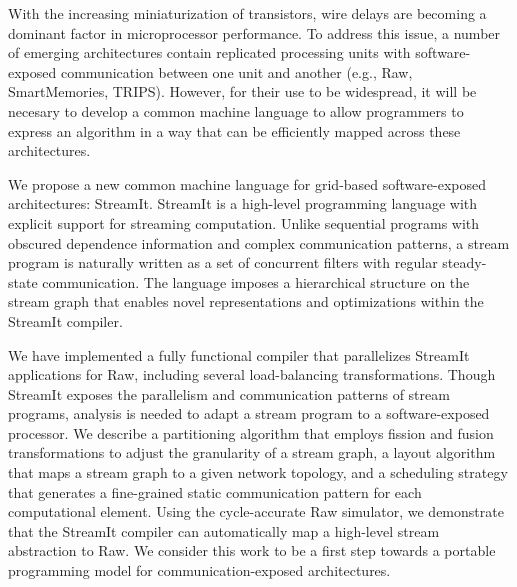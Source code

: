 With the increasing miniaturization of transistors, wire delays are
becoming a dominant factor in microprocessor performance.  To address
this issue, a number of emerging architectures contain replicated
processing units with software-exposed communication between one unit
and another (e.g., Raw, SmartMemories, TRIPS).  
However, for their use to be widespread, it will be necesary to
develop a common machine language to allow programmers to express an
algorithm in a way that can be efficiently mapped across 
these architectures. 
  
We propose a new common machine language for grid-based
software-exposed architectures: StreamIt. StreamIt is a
high-level programming language with explicit support for streaming
computation.  Unlike sequential programs with
obscured dependence information and complex communication patterns, a
stream program is naturally written as a set of concurrent filters
with regular steady-state communication.  The language
imposes a hierarchical structure on the stream graph that enables
novel representations and optimizations within the StreamIt compiler.

We have implemented a fully functional compiler that parallelizes
StreamIt applications for Raw, including several load-balancing
transformations. Though StreamIt exposes the parallelism and
communication patterns of stream programs, analysis is needed to
adapt a stream program to a software-exposed processor.  We describe a
partitioning algorithm that employs fission and fusion transformations
to adjust the granularity of a stream graph, a layout algorithm that
maps a stream graph to a given network topology, and a scheduling
strategy that generates a fine-grained static communication pattern
for each computational element.  Using the cycle-accurate Raw
simulator, we demonstrate that the StreamIt compiler can automatically
map a high-level stream abstraction to Raw.
We consider this work to be a first step towards a portable
programming model for communication-exposed architectures.




